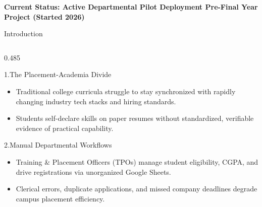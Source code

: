 \documentclass[aspectratio=169,10pt,xcolor={table,dvipsnames}]{beamer}
\begin{document}
\begin{frame}[t,plain]
  \vspace{0.12cm}
  \begin{tcolorbox}[
    enhanced,colback=LightSilver,colframe=BorderColor,
    arc=2pt,boxrule=0.5pt,
    left=4pt,right=4pt,top=2pt,bottom=2pt]
    \centering\fontsize{6.2}{7.5}\selectfont\bfseries\color{Navy}
    Current Status: Active Departmental Pilot Deployment \enspace\textbullet\enspace Pre-Final Year Project (Started 2026)
  \end{tcolorbox}
\end{frame}

\begin{frame}[t]{Introduction}
  \begin{columns}[T]
    \begin{column}{0.485\textwidth}
      \begin{navytitlecard}{1.\;The Placement-Academia Divide}
        \fontsize{6.5}{7.8}\selectfont
        \begin{itemize}\setlength{\itemsep}{1pt}
          \item Traditional college curricula struggle to stay synchronized with rapidly changing industry tech stacks and hiring standards.
          \item Students self-declare skills on paper resumes without standardized, verifiable evidence of practical capability.
        \end{itemize}
      \end{navytitlecard}
      \vspace{0.04cm}
      \begin{plaincard}{2.\;Manual Departmental Workflows}
        \fontsize{6.5}{7.8}\selectfont
        \begin{itemize}\setlength{\itemsep}{0.8pt}
          \item Training \& Placement Officers (TPOs) manage student eligibility, CGPA, and drive registrations via unorganized Google Sheets.
          \item Clerical errors, duplicate applications, and missed company deadlines degrade campus placement efficiency.
        \end{itemize}
      \end{plaincard}
    \end{column}


\end{columns}
\end{frame}
\end{document}
